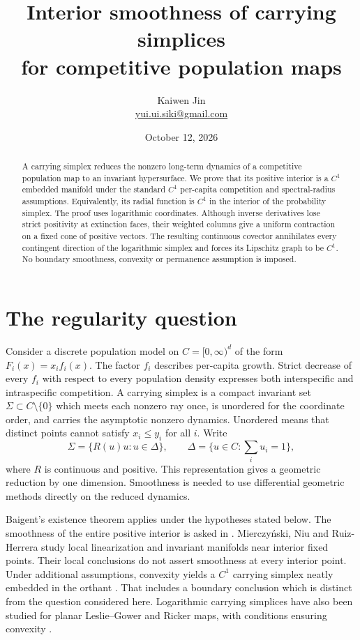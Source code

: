 \documentclass[11pt]{article}
\title{Interior smoothness of carrying simplices\protect\\
for competitive population maps}
\author{Kaiwen Jin\protect\\
\small\href{mailto:yui.ui.siki@gmail.com}{yui.ui.siki@gmail.com}}
\date{October 12, 2026}
\begin{document}
\maketitle

\begin{abstract}
A carrying simplex reduces the nonzero long-term dynamics of a competitive
population map to an invariant hypersurface. We prove that its positive
interior is a $C^1$ embedded manifold under the standard $C^1$ per-capita
competition and spectral-radius assumptions. Equivalently, its radial
function is $C^1$ in the interior of the probability simplex.
The proof uses logarithmic coordinates. Although inverse derivatives lose
strict positivity at extinction faces, their weighted columns give a uniform
contraction on a fixed cone of positive vectors. The resulting continuous
covector annihilates every contingent direction of the logarithmic simplex
and forces its Lipschitz graph to be $C^1$.
No boundary smoothness, convexity or permanence assumption is imposed.
\end{abstract}

\section{The regularity question}

Consider a discrete population model on $C=[0,\infty)^d$ of the form
$F_i(x)=x_i f_i(x)$. The factor $f_i$ describes per-capita growth. Strict
decrease of every $f_i$ with respect to every population density expresses
both interspecific and intraspecific competition. A carrying simplex is a
compact invariant set $\Sigma\subset C\setminus\{0\}$ which meets each
nonzero ray once, is unordered for the coordinate order, and carries the
asymptotic nonzero dynamics. Unordered means that distinct points cannot
satisfy $x_i\leq y_i$ for all $i$. Write
\begin{equation}\label{eq:radial}
 \Sigma=\{R(u)u:u\in\Delta\},\qquad
 \Delta=\{u\in C:\textstyle\sum_i u_i=1\},
\end{equation}
where $R$ is continuous and positive. This representation gives a geometric
reduction by one dimension. Smoothness is needed to use differential
geometric methods directly on the reduced dynamics.

Baigent's existence theorem \cite[Theorem~1]{Baigent} applies under the
hypotheses stated below. The smoothness of the entire positive interior is
asked in \cite[Section~6]{Baigent}. Mierczy\'nski, Niu and Ruiz-Herrera
\cite[Section~1, Corollaries~4.8--4.9 and Theorem~4.12]{MNR} study local
linearization and invariant manifolds near interior fixed points. Their local
conclusions do not assert smoothness at every interior point. Under additional
assumptions, convexity yields a $C^1$ carrying simplex neatly embedded in the
orthant \cite[Main Theorem]{Mierczynski}. That includes a boundary conclusion
which is distinct from the question considered here. Logarithmic carrying
simplices have also been studied for planar Leslie--Gower and Ricker maps,
with conditions ensuring convexity \cite{NYB}.
\end{document}

